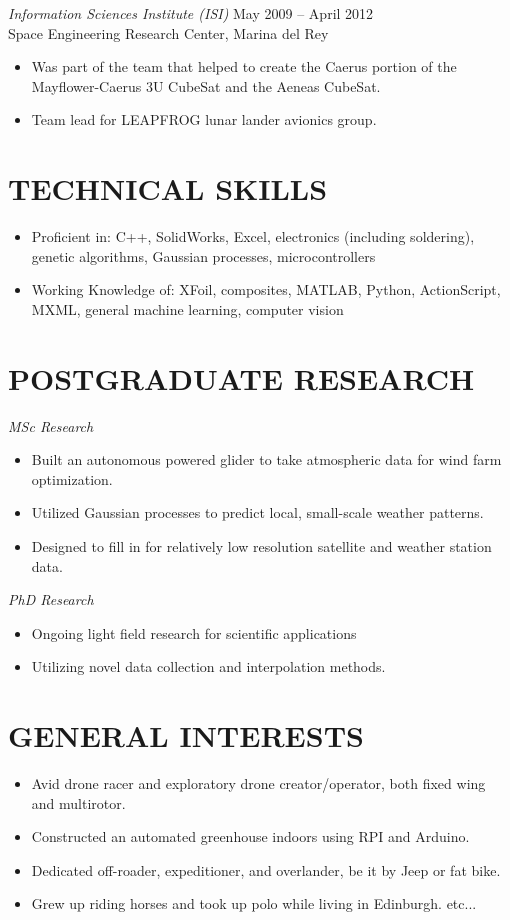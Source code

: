 \documentclass[10pt]{res} %
\begin{document}
\begin{resume}
{\sl Information Sciences Institute (ISI)} \hfill May 2009 -- April 2012 \\
Space Engineering Research Center, Marina del Rey 
\begin{itemize}\itemsep -2pt
\item Was part of the team that helped to create the Caerus portion of the Mayflower-Caerus 3U CubeSat and the Aeneas CubeSat.
\item Team lead for LEAPFROG lunar lander avionics group.
\end{itemize}
\section{TECHNICAL SKILLS}
\begin{itemize} \itemsep -2pt
\item Proficient in: C++, SolidWorks, Excel, electronics (including soldering), genetic algorithms, Gaussian processes, microcontrollers
\item Working Knowledge of: XFoil, composites, MATLAB, Python, ActionScript, MXML, general machine learning, computer vision
\end{itemize}

\section{POSTGRADUATE RESEARCH}
{\sl MSc Research}
\begin{itemize} \itemsep -2pt
\item Built an autonomous powered glider to take atmospheric data for wind farm optimization.
\item Utilized Gaussian processes to predict local, small-scale weather patterns.
\item Designed to fill in for relatively low resolution satellite and weather station data.
\end{itemize}
{\sl PhD Research}
\begin{itemize} \itemsep -2pt
\item Ongoing light field research for scientific applications
\item Utilizing novel data collection and interpolation methods.
\end{itemize}
\section{GENERAL INTERESTS}
\begin{itemize} \itemsep -2pt
\item Avid drone racer and exploratory drone creator/operator, both fixed wing and multirotor. 
\item Constructed an automated greenhouse indoors using RPI and Arduino.
\item Dedicated off-roader, expeditioner, and overlander, be it by Jeep or fat bike.
\item Grew up riding horses and took up polo while living in Edinburgh. etc...
\end{itemize}


\end{resume} 
\end{document}

